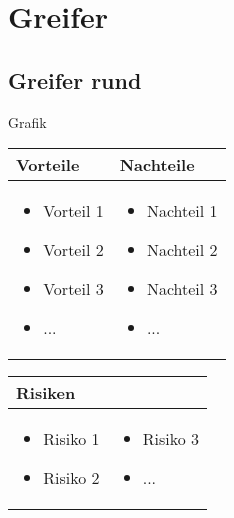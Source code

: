 
\section{Greifer}


\subsection{Greifer rund}

Grafik

\begin{table}[h]
\begin{tabular}{p{} | p{}}


 \textbf{Vorteile} & \textbf{Nachteile} \\ \hline
	 
\begin{itemize}
\item Vorteil 1
\item Vorteil 2
\item Vorteil 3
\item ...
\end{itemize}

 
 &
 
\begin{itemize}
\item Nachteil 1
\item Nachteil 2
\item Nachteil 3
\item ...
\end{itemize}

\end{tabular}
\end{table}

\begin{table}[h]
\begin{tabular}{p{}p{}}


 \textbf{Risiken} & \\ \hline
	 
\begin{itemize}
\item Risiko 1
\item Risiko 2
\end{itemize}
&
\begin{itemize}
\item Risiko 3
\item ...
\end{itemize}

 
\end{tabular}
\end{table}

